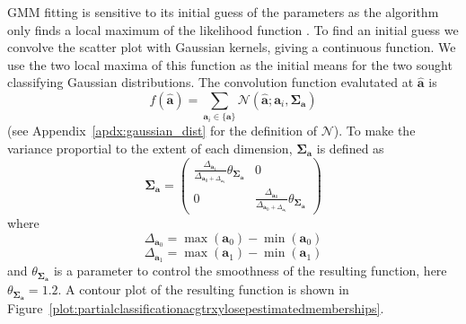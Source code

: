 \documentclass[letterpaper,12pt]{report}
\begin{document}
GMM fitting is sensitive to its initial guess of the parameters as the algorithm
only finds a local maximum of the likelihood function
\cite{kay1993fundamentals}.
To find an initial guess we convolve the scatter plot with Gaussian kernels,
giving a continuous function. We use the two local maxima of this function as
the initial means for the two sought classifying Gaussian distributions. The
convolution function evalutated at $\boldsymbol{\hat{a}}$ is
\[
    f(\boldsymbol{\hat{a}}) = \sum_{\boldsymbol{a}_i \in \{\boldsymbol{a}\}}
    \mathcal{N} \left( \boldsymbol{\hat{a}} ; \boldsymbol{a}_i,
    \boldsymbol{\Sigma}_{\boldsymbol{a}} \right)
\]
(see
Appendix~\ref{apdx:gaussian_dist} for the definition of $\mathcal{N}$).
To make the variance proportial to the extent of each dimension,
$\boldsymbol{\Sigma}_{\boldsymbol{a}}$ is defined as
\[
    \boldsymbol{\Sigma}_{\boldsymbol{a}}
    =
    \begin{pmatrix}
        \frac{\Delta_{\boldsymbol{a}_1}}{\Delta_{\boldsymbol{a}_0
        +\Delta_{\boldsymbol{a}_1}}}
            \theta_{\boldsymbol{\Sigma_{\boldsymbol{a}}}}
        & 0 \\
        0 & \frac{\Delta_{\boldsymbol{a}_0}}{\Delta_{\boldsymbol{a}_0
    +\Delta_{\boldsymbol{a}_1}}}
            \theta_{\boldsymbol{\Sigma_{\boldsymbol{a}}}}
    \end{pmatrix}
\]
where
\[
    \Delta_{\boldsymbol{a}_0} = \max \left( \boldsymbol{a}_0 \right)
        - \min \left( \boldsymbol{a}_0 \right)
\]
\[
    \Delta_{\boldsymbol{a}_1} = \max \left( \boldsymbol{a}_1 \right)
        - \min \left( \boldsymbol{a}_1 \right)
\]
and $\theta_{\boldsymbol{\Sigma_{\boldsymbol{a}}}}$ is a parameter to control
the smoothness of the resulting function, here
$\theta_{\boldsymbol{\Sigma_{\boldsymbol{a}}}} = 1.2$. A contour plot of the
resulting function is shown in
Figure~\ref{plot:partialclassificationacgtrxylosepestimatedmemberships}.
\end{document}
